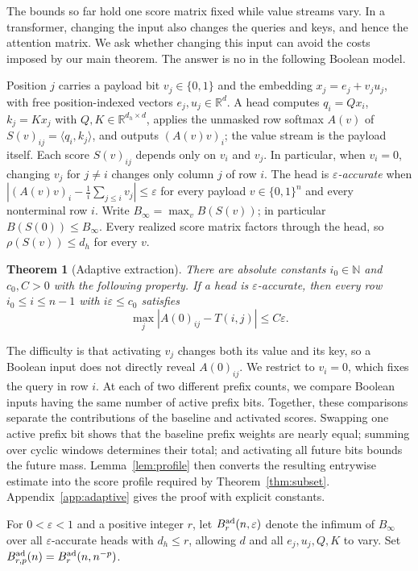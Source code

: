 \documentclass[10pt]{article} %
\newtheorem{theorem}{Theorem}
\theoremstyle{definition}
\newcommand{\R}{\mathbb R}
\begin{document}
The bounds so far hold one score matrix fixed while value streams vary.  In a
transformer, changing the input also changes the queries and keys, and hence
the attention matrix.  We ask whether changing this input can avoid the costs
imposed by our main theorem.  The answer is no in the following Boolean model.

Position \(j\) carries a payload bit \(v_j\in\{0,1\}\) and the embedding
\(x_j=e_j+v_ju_j\), with free position-indexed vectors \(e_j,u_j\in\R^d\).
A head computes \(q_i=Qx_i\), \(k_j=Kx_j\) with \(Q,K\in\R^{d_h\times d}\),
applies the unmasked row softmax \(A(v)\) of
\(S(v)_{ij}=\langle q_i,k_j\rangle\), and outputs \((A(v)v)_i\); the value
stream is the payload itself.  Each score \(S(v)_{ij}\) depends only on
\(v_i\) and \(v_j\).  In particular, when \(v_i=0\), changing \(v_j\) for
\(j\ne i\) changes only column \(j\) of row \(i\).
The head is \emph{\(\varepsilon\)-accurate} when
\(|(A(v)v)_i-\frac1i\sum_{j\le i}v_j|\le\varepsilon\) for every payload
\(v\in\{0,1\}^n\) and every nonterminal row \(i\).  Write
\(B_\infty=\max_v B(S(v))\); in particular \(B(S(0))\le B_\infty\).
Every realized score matrix factors through the head, so
\(\rho(S(v))\le d_h\) for every \(v\).

\begin{theorem}[Adaptive extraction]\label{thm:adaptive}
There are absolute constants \(i_0\in\mathbb N\) and \(c_0,C>0\) with the
following property.  If a head is \(\varepsilon\)-accurate, then every row
\(i_0\le i\le n-1\) with \(i\varepsilon\le c_0\) satisfies
\[
 \max_j|A(0)_{ij}-T(i,j)|\le C\varepsilon .
\]
\end{theorem}

The difficulty is that activating \(v_j\) changes both its value and its key,
so a Boolean input does not directly reveal \(A(0)_{ij}\).  We restrict to \(v_i=0\),
which fixes the query in row \(i\).  At each of two different prefix counts,
we compare Boolean inputs having the same number of active prefix bits.  Together,
these comparisons separate the contributions of the baseline and activated
scores.  Swapping one
active prefix bit shows that the baseline prefix weights are nearly equal;
summing over cyclic windows determines their total; and activating all future
bits bounds the future mass.
Lemma~\ref{lem:profile} then converts the resulting entrywise estimate into
the score profile required by Theorem~\ref{thm:subset}.
Appendix~\ref{app:adaptive} gives the proof with explicit constants.

For \(0<\varepsilon<1\) and a positive integer \(r\), let
\(B^{\rm ad}_{r}(n,\varepsilon)\) denote the infimum of \(B_\infty\) over
all \(\varepsilon\)-accurate heads with \(d_h\le r\), allowing \(d\) and
all \(e_j,u_j,Q,K\) to vary.  Set
\(B^{\rm ad}_{r,p}(n)=B^{\rm ad}_r(n,n^{-p})\).
\end{document}
